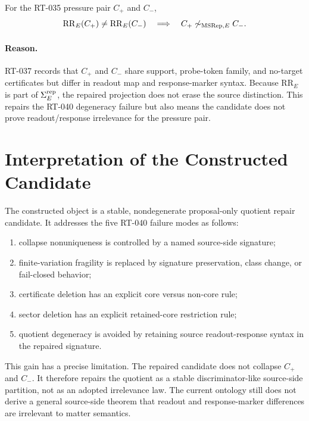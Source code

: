 \begin{proposition}
For the RT-035 pressure pair \(C_+\) and \(C_-\),
\[
  \mathrm{RR}_E(C_+)\neq\mathrm{RR}_E(C_-)
  \quad\Longrightarrow\quad
  C_+\not\mathrel{\sim_{\mathrm{MSRep},E}}C_-.
\]
\end{proposition}

\paragraph{Reason.}
RT-037 records that \(C_+\) and \(C_-\) share support, probe-token family, and
no-target certificates but differ in readout map and response-marker syntax.
Because \(\mathrm{RR}_E\) is part of \(\Sigma^{\mathrm{rep}}_E\), the repaired projection does
not erase the source distinction. This repairs the RT-040 degeneracy failure
but also means the candidate does not prove readout/response irrelevance for
the pressure pair.

\section{Interpretation of the Constructed Candidate}

The constructed object is a stable, nondegenerate proposal-only quotient
repair candidate. It addresses the five RT-040 failure modes as follows:
\begin{enumerate}
  \item collapse nonuniqueness is controlled by a named source-side signature;
  \item finite-variation fragility is replaced by signature preservation,
    class change, or fail-closed behavior;
  \item certificate deletion has an explicit core versus non-core rule;
  \item sector deletion has an explicit retained-core restriction rule;
  \item quotient degeneracy is avoided by retaining source
    readout-response syntax in the repaired signature.
\end{enumerate}

This gain has a precise limitation. The repaired candidate does not collapse
\(C_+\) and \(C_-\). It therefore repairs the quotient as a stable
discriminator-like source-side partition, not as an adopted irrelevance law.
The current ontology still does not derive a general source-side theorem that
readout and response-marker differences are irrelevant to matter semantics.

